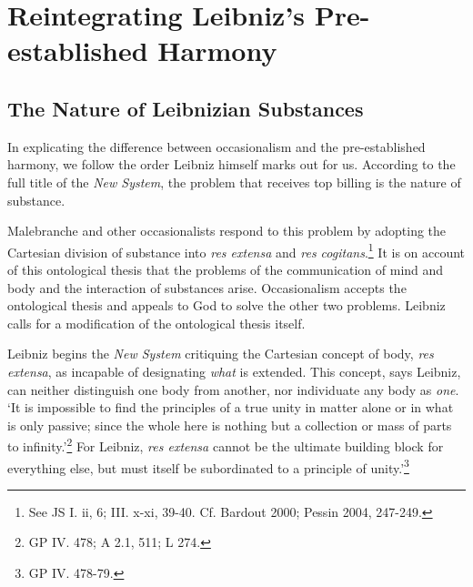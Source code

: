 \documentclass{article}
\begin{document}
\section{Reintegrating Leibniz's Pre-established
Harmony}

\subsection{The Nature of Leibnizian
Substances}

In explicating the difference between occasionalism and the
pre-established harmony, we follow the order Leibniz himself marks out
for us. According to the full title of the \emph{New System}, the
problem that receives top billing is the nature of substance.

Malebranche and other occasionalists respond to this problem by adopting
the Cartesian division of substance into \emph{res extensa} and
\emph{res cogitans}.\footnote{See JS I. ii, 6; III. x-xi, 39-40. Cf.
  Bardout 2000; Pessin 2004, 247-249.} It is on account of this
ontological thesis that the problems of the communication of mind and
body and the interaction of substances arise. Occasionalism accepts the
ontological thesis and appeals to God to solve the other two problems.
Leibniz calls for a modification of the ontological thesis itself.

Leibniz begins the \emph{New System} critiquing the Cartesian concept of
body, \emph{res extensa}, as incapable of designating \emph{what} is
extended. This concept, says Leibniz, can neither distinguish one body
from another, nor individuate any body as \emph{one}. `It is impossible
to find the principles of a true unity in matter alone or in what is
only passive; since the whole here is nothing but a collection or mass
of parts to infinity.'\footnote{GP IV. 478; A 2.1, 511; L 274.} For
Leibniz, \emph{res extensa} cannot be the ultimate building block for
everything else, but must itself be subordinated to a principle of
unity.'\footnote{GP IV. 478-79.}
\end{document}
